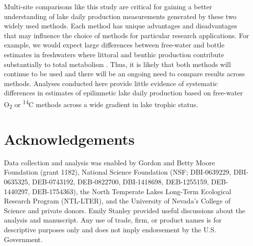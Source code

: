 \documentclass[12pt, oneside]{article}
\begin{document}
Multi-site comparisons like this study are critical for gaining a better understanding of lake daily production measurements generated by these two widely used methods. Each method has unique advantages and disadvantages that may influence the choice of methods for particular research applications. For example, we would expect large differences between free-water and bottle estimates in freshwaters where littoral and benthic production contribute substantially to total metabolism \citep{lauster_gross_2006, VandeBogert_Carpenter_Cole_Pace_2007}. Thus, it is likely that both methods will continue to be used and there will be an ongoing need to compare results across methods. Analyses conducted here provide little evidence of systematic differences in estimates of epilimnetic lake daily production based on free-water O\textsubscript{2} or \textsuperscript{14}C methods across a wide gradient in lake trophic status.



\newpage



\clearpage
\section*{Acknowledgements}
Data collection and analysis was enabled by Gordon and Betty Moore Foundation (grant 1182), National Science Foundation (NSF; DBI-0639229, DBI-0635325, DEB-0743192, DEB-0822700, DBI-1418698, DEB-1255159, DEB-1440297, DEB-1754363), the North Temperate Lakes Long-Term Ecological Research Program (NTL-LTER), and the University of Nevada's College of Science and private donors. Emily Stanley provided useful discussions about the analysis and manuscript. Any use of trade, firm, or product names is for descriptive purposes only and does not imply endorsement by the U.S. Government.

\newpage
\end{document}
